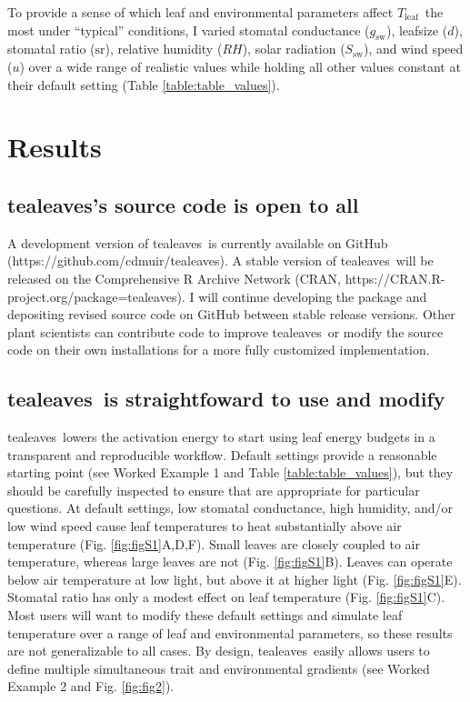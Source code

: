 \documentclass[11pt, oneside]{article}
\newcommand{\pkg}[1]{{\fontseries{b}\selectfont #1}}
\newcommand{\tealeaves}{\pkg{tealeaves}}
\newcommand{\tleaf}{$T_\mathrm{leaf}$}
\begin{document}
To provide a sense of which leaf and environmental parameters affect \tleaf~the most under ``typical'' conditions, I varied stomatal conductance ($g_\mathrm{sw}$), leafsize ($d$), stomatal ratio ($\mathrm{sr}$), relative humidity ($\mathit{RH}$), solar radiation ($S_\mathrm{sw}$), and wind speed ($u$) over a wide range of realistic values while holding all other values constant at their default setting (Table \ref{table:table_values}).

\section*{Results}

\subsection*{\tealeaves's source code is open to all}

A development version of \tealeaves~is currently available on GitHub (https://github.com/cdmuir/tealeaves). A stable version of \tealeaves~will be released on the Comprehensive R Archive Network (CRAN, https://CRAN.R-project.org/package=tealeaves). I will continue developing the package and depositing revised source code on GitHub between stable release versions. Other plant scientists can contribute code to improve \tealeaves~or modify the source code on their own installations for a more fully customized implementation. 

\subsection*{\tealeaves~is straightfoward to use and modify}

\tealeaves~lowers the activation energy to start using leaf energy budgets in a transparent and reproducible workflow. Default settings provide a reasonable starting point (see Worked Example 1 and Table \ref{table:table_values}), but they should be carefully inspected to ensure that are appropriate for particular questions. At default settings, low stomatal conductance, high humidity, and/or low wind speed cause leaf temperatures to heat substantially above air temperature (Fig. \ref{fig:figS1}A,D,F). Small leaves are closely coupled to air temperature, whereas large leaves are not (Fig. \ref{fig:figS1}B). Leaves can operate below air temperature at low light, but above it at higher light (Fig. \ref{fig:figS1}E). Stomatal ratio has only a modest effect on leaf temperature (Fig. \ref{fig:figS1}C). Most users will want to modify these default settings and simulate leaf temperature over a range of leaf and environmental parameters, so these results are not generalizable to all cases. By design, \tealeaves~easily allows users to define multiple simultaneous trait and environmental gradients (see Worked Example 2 and Fig. \ref{fig:fig2}).
\end{document}

